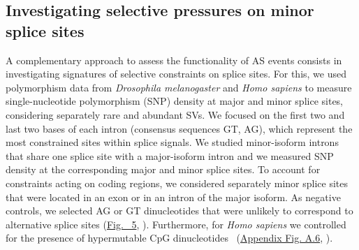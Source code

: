 \subsection{Investigating selective pressures on minor splice sites}
A complementary approach to assess the functionality of AS events consists in investigating signatures of selective constraints on splice sites. For this, we used polymorphism data from \textit{Drosophila melanogaster} and \textit{Homo sapiens} to measure single-nucleotide polymorphism (SNP) density at major and minor splice sites, considering separately rare and abundant \acrshort{SV}s. We focused on the first two and last two bases of each intron (consensus sequences GT, AG), which represent the most constrained sites within splice signals. We studied minor-isoform introns that share one splice site with a major-isoform intron and we measured SNP density at the corresponding major and minor splice sites. To account for constraints acting on coding regions, we considered separately minor splice sites that were located in an exon or in an intron of the major isoform. As negative controls, we selected AG or GT dinucleotides that were unlikely to correspond to alternative splice sites (\hyperref[fig:AS5]{Fig.~ 5}, ). Furthermore, for \textit{Homo sapiens} we controlled for the presence of hypermutable \gls{CpG} dinucleotides~\citep{tomso_sequence_2003} (\hyperref[supp_fig:AS6]{Appendix Fig. A.6}, ). 


